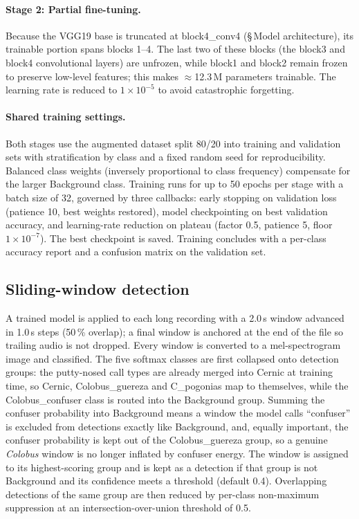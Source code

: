 \documentclass[review,3p,times]{elsarticle}
\begin{document}
\paragraph{Stage 2: Partial fine-tuning.}
Because the VGG19 base is truncated at block4\_conv4
(\S\,Model architecture), its trainable portion spans blocks 1--4. The last two of these
blocks (the block3 and block4 convolutional layers) are
unfrozen, while block1 and block2 remain frozen to preserve
low-level features; this makes $\approx$12.3\,M parameters trainable. The
learning rate is reduced to $1 \times 10^{-5}$ to avoid catastrophic
forgetting.

\paragraph{Shared training settings.}
Both stages use the augmented dataset split 80/20 into training and validation
sets with stratification by class and a fixed random seed for
reproducibility. Balanced class weights (inversely proportional to class
frequency) compensate for the larger Background class. Training runs for up to
50 epochs per stage with a batch size of 32, governed by three callbacks:
early stopping on validation loss (patience 10, best weights restored),
model checkpointing on best validation accuracy, and learning-rate reduction
on plateau (factor 0.5, patience 5, floor $1 \times 10^{-7}$). The best
checkpoint is saved. Training concludes with a
per-class accuracy report and a confusion matrix on the validation set.

\subsection*{Sliding-window detection}

A trained model is applied to each long recording with a 2.0\,s window
advanced in 1.0\,s steps (50\,\% overlap); a final window is anchored at the
end of the file so trailing audio is not dropped. Every window is converted to
a mel-spectrogram image and classified. The five softmax classes are first
collapsed onto detection groups: the
putty-nosed call types are already merged into Cernic at training time, so
Cernic, Colobus\_guereza and C\_pogonias map to themselves, while the
Colobus\_confuser class is routed into the Background group. Summing the confuser probability
into Background means a window the model calls ``confuser'' is excluded from
detections exactly like Background, and, equally important, the confuser
probability is kept out of the Colobus\_guereza group, so a genuine
\textit{Colobus} window is no longer inflated by confuser energy. The window is
assigned to its highest-scoring group and is kept as a detection if that group
is not Background and its confidence meets a threshold (default 0.4).
Overlapping detections of the same group are then reduced by per-class
non-maximum suppression at an intersection-over-union threshold of 0.5.
\end{document}
